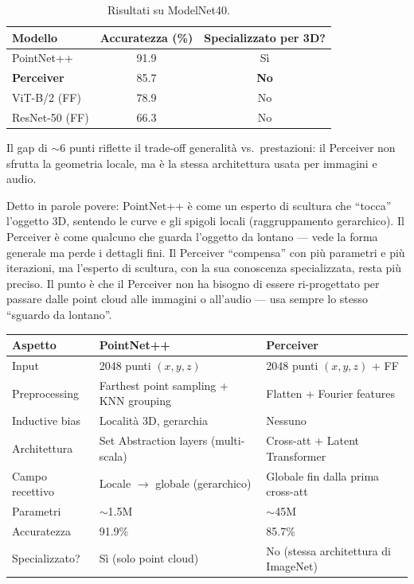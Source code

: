 \documentclass[12pt,a4paper]{article}
\begin{document}
\begin{table}[htbp]
\centering
\caption{Risultati su ModelNet40.}
\begin{tabular}{@{}lcc@{}}
\toprule
\textbf{Modello} & \textbf{Accuratezza (\%)} & \textbf{Specializzato per 3D?} \\
\midrule
PointNet++ & 91.9 & S\`i \\
\textbf{Perceiver} & 85.7 & \textbf{No} \\
ViT-B/2 (FF) & 78.9 & No \\
ResNet-50 (FF) & 66.3 & No \\
\bottomrule
\end{tabular}
\end{table}

Il gap di $\sim$6 punti riflette il trade-off generalit\`a vs.\ prestazioni: il Perceiver non sfrutta la geometria locale, ma \`e la stessa architettura usata per immagini e audio.

\begin{notabox}
Detto in parole povere: PointNet++ \`e come un esperto di scultura che ``tocca'' l'oggetto 3D, sentendo le curve e gli spigoli locali (raggruppamento gerarchico). Il Perceiver \`e come qualcuno che guarda l'oggetto da lontano --- vede la forma generale ma perde i dettagli fini. Il Perceiver ``compensa'' con pi\`u parametri e pi\`u iterazioni, ma l'esperto di scultura, con la sua conoscenza specializzata, resta pi\`u preciso. Il punto \`e che il Perceiver non ha bisogno di essere ri-progettato per passare dalle point cloud alle immagini o all'audio --- usa sempre lo stesso ``sguardo da lontano''.
\end{notabox}

\begin{examplebox}
\begin{center}
\begin{tabular}{@{}p{4cm}p{5cm}p{4.5cm}@{}}
\toprule
\textbf{Aspetto} & \textbf{PointNet++} & \textbf{Perceiver} \\
\midrule
Input & 2048 punti $(x,y,z)$ & 2048 punti $(x,y,z)$ + FF \\
Preprocessing & Farthest point sampling + KNN grouping & Flatten + Fourier features \\
Inductive bias & Localit\`a 3D, gerarchia & Nessuno \\
Architettura & Set Abstraction layers (multi-scala) & Cross-att + Latent Transformer \\
Campo recettivo & Locale $\to$ globale (gerarchico) & Globale fin dalla prima cross-att \\
Parametri & $\sim$1.5M & $\sim$45M \\
Accuratezza & 91.9\% & 85.7\% \\
Specializzato? & S\`i (solo point cloud) & No (stessa architettura di ImageNet) \\
\bottomrule
\end{tabular}
\end{center}
\end{examplebox}
\end{document}
